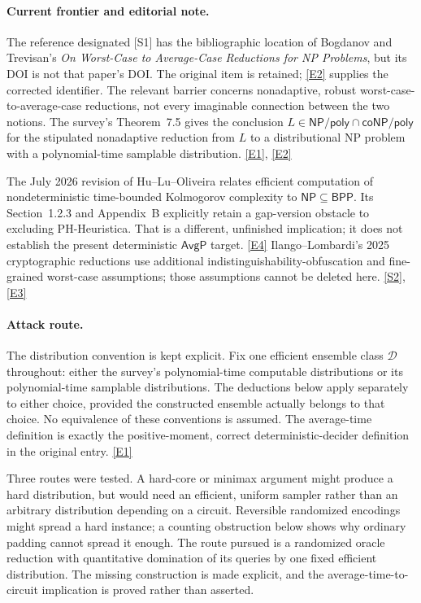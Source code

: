 \documentclass[11pt]{article}
\newcommand{\sref}[2]{\hyperlink{source:#1:#2}{[S#2]}}
\newcommand{\eref}[2]{\hyperlink{extra:#1:#2}{[E#2]}}
\begin{document}
\paragraph{Current frontier and editorial note.}
The reference designated [S1] has the bibliographic location of Bogdanov
and Trevisan's \emph{On Worst-Case to Average-Case Reductions for NP
Problems}, but its DOI is not that paper's DOI. The original item is
retained; \eref{52}{2} supplies the corrected identifier. The relevant
barrier concerns nonadaptive, robust worst-case-to-average-case reductions,
not every imaginable connection between the two notions. The survey's
Theorem~7.5 gives the conclusion
$L\in\mathsf{NP/poly}\cap\mathsf{coNP/poly}$ for the stipulated
nonadaptive reduction from $L$ to a distributional NP problem with a
polynomial-time samplable distribution. \eref{52}{1}, \eref{52}{2}

The July 2026 revision of Hu--Lu--Oliveira relates efficient computation
of nondeterministic time-bounded Kolmogorov complexity to
$\mathsf{NP}\subseteq\mathsf{BPP}$. Its Section~1.2.3 and Appendix~B
explicitly retain a gap-version obstacle to excluding PH-Heuristica.
That is a different, unfinished implication; it does not establish the
present deterministic $\mathsf{AvgP}$ target. \eref{52}{4}
Ilango--Lombardi's 2025 cryptographic reductions use additional
indistinguishability-obfuscation and fine-grained worst-case assumptions;
those assumptions cannot be deleted here. \sref{52}{2}, \eref{52}{3}

\paragraph{Attack route.}
The distribution convention is kept explicit. Fix one efficient ensemble
class $\mathcal D$ throughout: either the survey's polynomial-time
computable distributions or its polynomial-time samplable distributions.
The deductions below apply separately to either choice, provided the
constructed ensemble actually belongs to that choice. No equivalence of
these conventions is assumed. The average-time definition is exactly the
positive-moment, correct deterministic-decider definition in the original
entry. \eref{52}{1}

Three routes were tested. A hard-core or minimax argument might produce a
hard distribution, but would need an efficient, uniform sampler rather
than an arbitrary distribution depending on a circuit. Reversible
randomized encodings might spread a hard instance; a counting obstruction
below shows why ordinary padding cannot spread it enough. The route
pursued is a randomized oracle reduction with quantitative domination of
its queries by one fixed efficient distribution. The missing construction
is made explicit, and the average-time-to-circuit implication is proved
rather than asserted.
\end{document}
